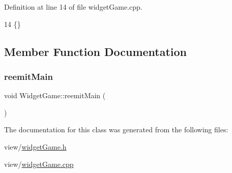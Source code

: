 Definition at line 14 of file widget\+Game.\+cpp.


\begin{DoxyCode}
14 \{\}
\end{DoxyCode}


\subsection{Member Function Documentation}
\hypertarget{class_widget_game_a39c76aac5eff9242d2253017c1209027}{}\label{class_widget_game_a39c76aac5eff9242d2253017c1209027} 
\subsubsection{\texorpdfstring{reemit\+Main}{reemitMain}}
{\footnotesize\ttfamily void Widget\+Game\+::reemit\+Main (\begin{DoxyParamCaption}{ }\end{DoxyParamCaption})\hspace{0.3cm}{\ttfamily [signal]}}



The documentation for this class was generated from the following files\+:\begin{DoxyCompactItemize}
\item 
view/\hyperlink{widget_game_8h}{widget\+Game.\+h}\item 
view/\hyperlink{widget_game_8cpp}{widget\+Game.\+cpp}\end{DoxyCompactItemize}
